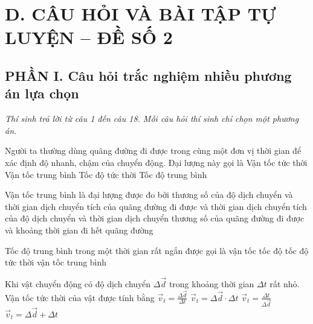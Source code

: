 \section*{D. CÂU HỎI VÀ BÀI TẬP TỰ LUYỆN -- ĐỀ SỐ 2}

\setcounter{ex}{0}
\subsection*{PHẦN I. Câu hỏi trắc nghiệm nhiều phương án lựa chọn}
\textit{Thí sinh trả lời từ câu 1 đến câu 18. Mỗi câu hỏi thí sinh chỉ chọn một phương án.}

\begin{ex} Người ta thường dùng quãng đường đi được trong cùng một đơn vị thời gian để xác định độ nhanh, chậm của chuyển động. Đại lượng này gọi là
\choice
{Vận tốc tức thời}
{Vận tốc trung bình}
{Tốc độ tức thời}
{\True Tốc độ trung bình}
\end{ex}

\begin{ex} Vận tốc trung bình là đại lượng được đo bởi
\choice
{\True thương số của độ dịch chuyển và thời gian dịch chuyển}
{tích của quãng đường đi được và thời gian dịch chuyển}
{tích của độ dịch chuyển và thời gian dịch chuyển}
{thương số của quãng đường đi được và khoảng thời gian đi hết quãng đường}
\end{ex}

\begin{ex} Tốc độ trung bình trong một thời gian rất ngắn được gọi là
\choice
{vận tốc}
{tốc độ}
{\True tốc độ tức thời}
{vận tốc trung bình}
\end{ex}

\begin{ex} Khi vật chuyển động có độ dịch chuyển $\Delta\vec{d}$ trong khoảng thời gian $\Delta t$ rất nhỏ. Vận tốc tức thời của vật được tính bằng
\choice
{\True $\vec{v}_t = \frac{\Delta\vec{d}}{\Delta t}$}
{$\vec{v}_t = \Delta\vec{d} \cdot \Delta t$}
{$\vec{v}_t = \frac{\Delta t}{\Delta\vec{d}}$}
{$\vec{v}_t = \Delta\vec{d} + \Delta t$}
\end{ex}

